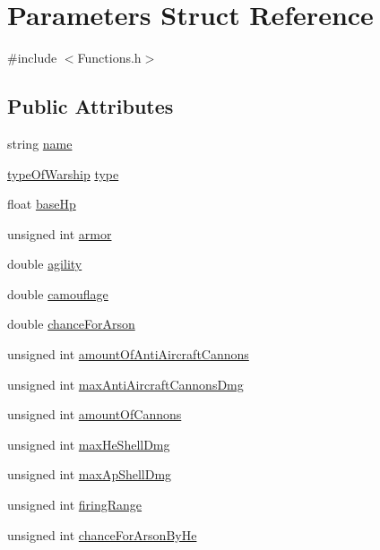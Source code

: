 \hypertarget{struct_parameters}{}\section{Parameters Struct Reference}
\label{struct_parameters}


{\ttfamily \#include $<$Functions.\+h$>$}

\subsection*{Public Attributes}
\begin{DoxyCompactItemize}
\item 
string \hyperlink{struct_parameters_a4b2f794128331583de50c0034c5998d2}{name}
\item 
\hyperlink{_functions_8h_ac7cd30cb79c1068579276e4cb287a2a7}{type\+Of\+Warship} \hyperlink{struct_parameters_a44a06370c5e94b66033e8f1178b90028}{type}
\item 
float \hyperlink{struct_parameters_a7bf937bc0aa16474d0146cf50ab4966c}{base\+Hp}
\item 
unsigned int \hyperlink{struct_parameters_a630c021422dbf1bdbbbacb269ed1a4fd}{armor}
\item 
double \hyperlink{struct_parameters_a7963432ebc43abe0bae0891dec48a987}{agility}
\item 
double \hyperlink{struct_parameters_ac2b1aba1f515ab5e2d253b5299736341}{camouflage}
\item 
double \hyperlink{struct_parameters_ade423be2e079e96d86a2b75cf5a1eb71}{chance\+For\+Arson}
\item 
unsigned int \hyperlink{struct_parameters_a7e763517fc70161d9edb3dd6290457bb}{amount\+Of\+Anti\+Aircraft\+Cannons}
\item 
unsigned int \hyperlink{struct_parameters_aba0a971e0cf5799f584ed4d00927aeea}{max\+Anti\+Aircraft\+Cannons\+Dmg}
\item 
unsigned int \hyperlink{struct_parameters_a13d11f0501e41cb7aa7bbb9757c5b5da}{amount\+Of\+Cannons}
\item 
unsigned int \hyperlink{struct_parameters_a8019e2c74fba6a925dde0364fa239a72}{max\+He\+Shell\+Dmg}
\item 
unsigned int \hyperlink{struct_parameters_ac1e0fe7e3177be12e7d4adcb9a3ceccd}{max\+Ap\+Shell\+Dmg}
\item 
unsigned int \hyperlink{struct_parameters_a025824e12728e624df3c4b85c57df3c4}{firing\+Range}
\item 
unsigned int \hyperlink{struct_parameters_a8665ae9bf926c6006625a1f95ee62fee}{chance\+For\+Arson\+By\+He}

\end{DoxyCompactItemize}
